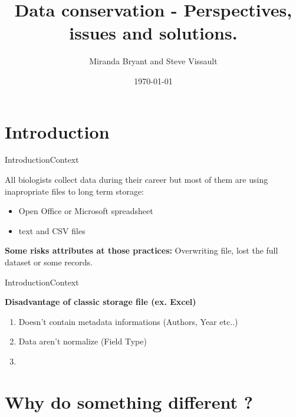 \documentclass{eecslides}
\title[Data Storage]{Data conservation - Perspectives, issues and solutions.}
\author[M. Bryant and S. Vissault]{\color{white}  Miranda Bryant and Steve Vissault}
\institute[\color{white} UQAR]{\color{white} \textbf{Les midis numériques}}
\date{ \color{white} \today}
\begin{document}
\begin{frame}[plain]
\titlepage
\end{frame}


\section{Introduction}

\begin{frame}{Introduction}{Context}

All biologists collect data during their career but most of them are using \alert{inapropriate files} to long term storage:

\begin{itemize}
	\item  Open Office or Microsoft spreadsheet
	\item  text and CSV files
\end{itemize}

\textbf{Some risks attributes at those practices:} Overwriting file, lost the full dataset or some records.

\end{frame}


\begin{frame}{Introduction}{Context}

\textbf{\alert{Disadvantage of classic storage file (ex. Excel)}}

\begin{enumerate}
	\item Doesn't contain metadata informations (Authors, Year etc..)
	\item Data aren't normalize (Field Type) 
	\item 
\end{enumerate}


\end{frame}


\section{Why do something different ?}
\end{document}
